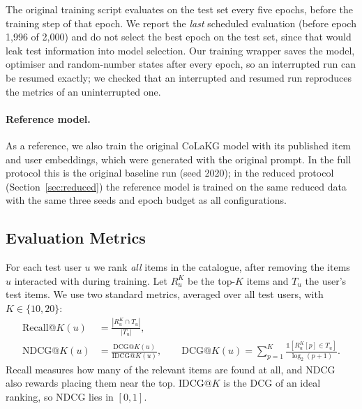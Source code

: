 \documentclass[a4paper,11pt]{article}
\begin{document}
The original training script evaluates on the test set every five epochs, before the training step of that epoch. We report the \emph{last} scheduled evaluation (before epoch 1,996 of 2,000) and do not select the best epoch on the test set, since that would leak test information into model selection. Our training wrapper saves the model, optimiser and random-number states after every epoch, so an interrupted run can be resumed exactly; we checked that an interrupted and resumed run reproduces the metrics of an uninterrupted one.

\paragraph{Reference model.} As a reference, we also train the original CoLaKG model with its published item and user embeddings, which were generated with the original prompt. In the full protocol this is the original baseline run (seed 2020); in the reduced protocol (Section~\ref{sec:reduced}) the reference model is trained on the same reduced data with the same three seeds and epoch budget as all configurations.

\subsection{Evaluation Metrics}
For each test user $u$ we rank \emph{all} items in the catalogue, after removing the items $u$ interacted with during training. Let $R_u^K$ be the top-$K$ items and $T_u$ the user's test items. We use two standard metrics, averaged over all test users, with $K\in\{10,20\}$:
\begin{align}
\mathrm{Recall@}K(u) &= \frac{|R_u^K \cap T_u|}{|T_u|}, \\
\mathrm{NDCG@}K(u) &= \frac{\mathrm{DCG@}K(u)}{\mathrm{IDCG@}K(u)}, \qquad
\mathrm{DCG@}K(u) = \sum_{p=1}^{K} \frac{\mathbb{1}\left[R_u^K[p]\in T_u\right]}{\log_2(p+1)}.
\end{align}
Recall measures how many of the relevant items are found at all, and NDCG~\cite{jarvelin2002ndcg} also rewards placing them near the top. $\mathrm{IDCG@}K$ is the DCG of an ideal ranking, so NDCG lies in $[0,1]$.
\end{document}
